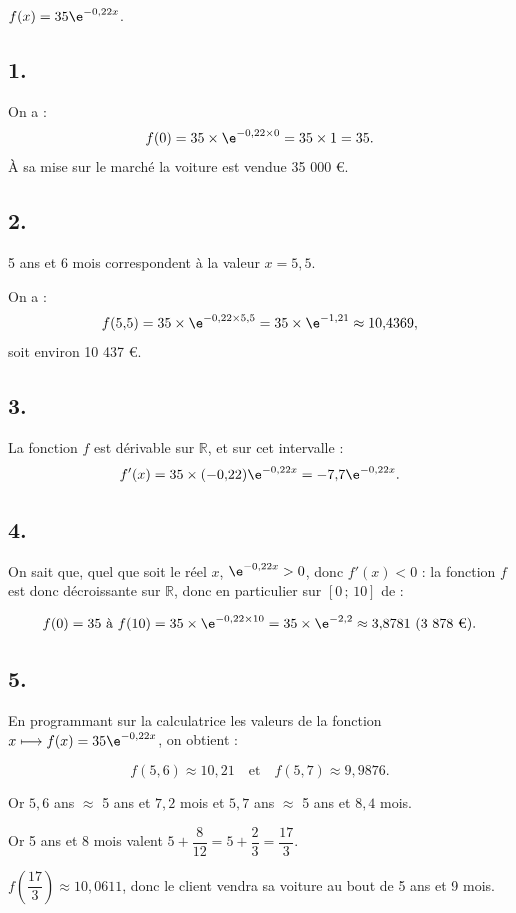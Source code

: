 \( f(x) = 35 \e^{-0{,}22x} \).

\subsection*{1.}

On a :
\[
f(0) = 35 \times \e^{-0{,}22 \times 0} = 35 \times 1 = 35.
\]
À sa mise sur le marché la voiture est vendue 35 000 €.

\subsection*{2.}

5 ans et 6 mois correspondent à la valeur \( x = 5{,}5 \).

On a :
\[
f(5{,}5) = 35 \times \e^{-0{,}22 \times 5{,}5} = 35 \times \e^{-1{,}21} \approx 10{,}4369,
\]
soit environ 10 437 €.

\subsection*{3.}

La fonction \( f \) est dérivable sur \(\mathbb{R}\), et sur cet intervalle :
\[
f'(x) = 35 \times (-0{,}22) \e^{-0{,}22x} = -7{,}7 \e^{-0{,}22x}.
\]

\subsection*{4.}

On sait que, quel que soit le réel \( x \), \( \e^{-0{,}22x} > 0 \), donc \( f'(x) < 0 \) : la fonction \( f \) est donc décroissante sur \(\mathbb{R}\), donc en particulier sur \([0 \,;\, 10]\) de :

\[
f(0) = 35 \text{ à } f(10) = 35 \times \e^{-0{,}22 \times 10} = 35 \times \e^{-2{,}2} \approx 3{,}8781 \text{ (3 878 €)}.
\]

\subsection*{5.}

En programmant sur la calculatrice les valeurs de la fonction \( x \longmapsto f(x) = 35\e^{-0{,}22x} \), on obtient :

\[
f(5{,}6) \approx 10{,}21 \quad \text{et} \quad f(5{,}7) \approx 9{,}9876.
\]

Or \(5{,}6\) ans \( \approx \) 5 ans et \(7{,}2\) mois et \(5{,}7\) ans \( \approx \) 5 ans et \(8{,}4\) mois.

Or 5 ans et 8 mois valent \( 5 + \dfrac{8}{12} = 5 + \dfrac{2}{3} = \dfrac{17}{3} \).

\( f\left(\dfrac{17}{3}\right) \approx 10{,}0611 \), donc le client vendra sa voiture au bout de 5 ans et 9 mois.
